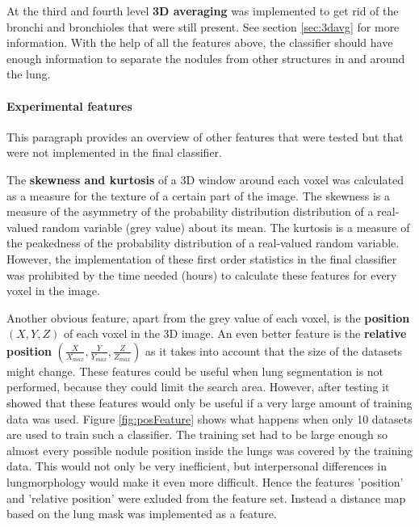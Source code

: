 At the third and fourth level \textbf{3D averaging} was implemented to get rid
of the bronchi and bronchioles that were still present. See section
\ref{sec:3davg} for more information. With the help of all the features above,
the classifier should have enough information to separate the nodules from other
structures in and around the lung.

\paragraph{Experimental features}
This paragraph provides an overview of other features that were
tested but that were not implemented in the final classifier.

The \textbf{skewness and kurtosis} of a 3D window around each
voxel was calculated as a measure for the texture of a certain part of the image. The
skewness is a measure of the asymmetry of the probability distribution
distribution of a real-valued random variable (grey value) about its mean. The
kurtosis is a measure of the peakedness of the probability distribution of a
real-valued random variable. However, the implementation of these first order
statistics in the final classifier was prohibited by the time needed (hours) to
calculate these features for every voxel in the image.

Another obvious feature, apart from the grey value of each voxel, is the
\textbf{position} $(X, Y, Z)$ of each voxel in the 3D image. An even better
feature is the \textbf{relative position} $(\tfrac{X}{X_{max}},
\tfrac{Y}{Y_{max}}, \tfrac{Z}{Z_{max}})$ as it takes into account that the size
of the datasets might change. These features could be useful when lung
segmentation is not performed, because they could limit the search area.
However, after testing it showed that these features would only be useful if a
very large amount of training data was used. Figure \ref{fig:posFeature} shows
what happens when only 10 datasets are used to train such a classifier. The
training set had to be large enough so almost every possible nodule position
inside the lungs was covered by the training data. This would not only be very
inefficient, but interpersonal differences in lungmorphology would make it even
more difficult. Hence the features 'position' and 'relative position' were
exluded from the feature set.
Instead a distance map based on the lung mask was implemented as a feature.

